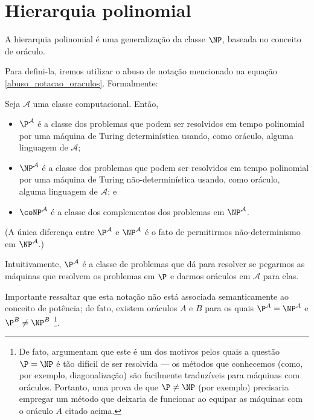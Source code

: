 \section{Hierarquia polinomial}
\label{hierarquia_polinomial}

A hierarquia polinomial é uma generalização da classe $\NP$,
baseada no conceito de oráculo.

Para defini-la,
iremos utilizar o abuso de notação mencionado na equação
\ref{abuso_notacao_oraculos}.
Formalmente:

\begin{definition}
    Seja $\mathcal A$ uma classe computacional.
    Então,
    \begin{itemize}
        \item $\P^\mathcal A$
            é a classe dos problemas que podem ser resolvidos em tempo polinomial
            por uma máquina de Turing determinística
            usando, como oráculo,
            alguma linguagem de $\mathcal A$;
        \item $\NP^\mathcal A$
            é a classe dos problemas que podem ser resolvidos em tempo polinomial
            por uma máquina de Turing não-determinística
            usando, como oráculo,
            alguma linguagem de $\mathcal A$;
            e
        \item $\coNP^\mathcal A$
            é a classe dos complementos dos problemas em $\NP^\mathcal A$.
    \end{itemize}
\end{definition}

(A única diferença entre $\P^\mathcal A$ e $\NP^\mathcal A$
é o fato de permitirmos não-determinismo em $\NP^\mathcal A$.)

Intuitivamente,
$\P^\mathcal A$ é a classe de problemas que dá para resolver
se pegarmos as máquinas que resolvem os problemas em $\P$
e darmos oráculos em $\mathcal A$ para elas.

Importante ressaltar que esta notação
não está associada semanticamente ao conceito de potência;
de fato,
existem oráculos $A$ e $B$ para os quais
$\P ^ A = \NP ^ A$ e $\P ^ B \neq \NP ^ B$
\cite[p. 362]{HopcroftUllman1979}%
\footnote{
    De fato, 
    argumentam que este é um dos motivos pelos quais
    a questão $\P = \NP$ é tão difícil de ser resolvida
    --- os métodos que conhecemos
    (como, por exemplo, diagonalização)
    são facilmente traduzíveis para máquinas com oráculos.
    Portanto,
    uma prova de que $\P \neq \NP$ (por exemplo)
    precisaria empregar um método que deixaria de funcionar
    ao equipar as máquinas com o oráculo $A$ citado acima.
}.


